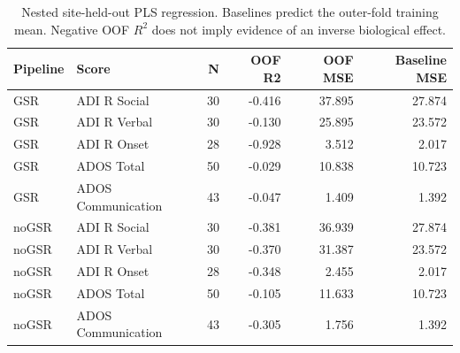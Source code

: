 \begin{table}[htbp]
\centering
\small
\caption{Nested site-held-out PLS regression. Baselines predict the outer-fold training mean. Negative OOF $R^2$ does not imply evidence of an inverse biological effect.}\label{tab:Splsr}
\begin{tabular}{llrrrr}
\toprule
Pipeline & Score & N & OOF R2 & OOF MSE & Baseline MSE \\
\midrule
GSR & ADI R Social & 30 & -0.416 & 37.895 & 27.874 \\
GSR & ADI R Verbal & 30 & -0.130 & 25.895 & 23.572 \\
GSR & ADI R Onset & 28 & -0.928 & 3.512 & 2.017 \\
GSR & ADOS Total & 50 & -0.029 & 10.838 & 10.723 \\
GSR & ADOS Communication & 43 & -0.047 & 1.409 & 1.392 \\
noGSR & ADI R Social & 30 & -0.381 & 36.939 & 27.874 \\
noGSR & ADI R Verbal & 30 & -0.370 & 31.387 & 23.572 \\
noGSR & ADI R Onset & 28 & -0.348 & 2.455 & 2.017 \\
noGSR & ADOS Total & 50 & -0.105 & 11.633 & 10.723 \\
noGSR & ADOS Communication & 43 & -0.305 & 1.756 & 1.392 \\
\bottomrule
\end{tabular}
\end{table}
